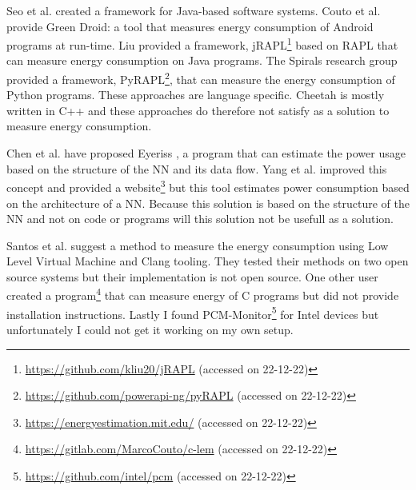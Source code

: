 \documentclass[../thesis.tex]{subfiles}
\begin{document}
Seo et al. \parencite*{seo2008} created a framework for Java-based software systems. Couto et al. \parencite*{couto2015} provide Green Droid: a tool that measures energy consumption of Android programs at run-time. Liu provided a framework, jRAPL\footnote{\url{https://github.com/kliu20/jRAPL} (accessed on 22-12-22)} based on RAPL that can measure energy consumption on Java programs. The Spirals research group provided a framework, PyRAPL\footnote{\url{https://github.com/powerapi-ng/pyRAPL} (accessed on 22-12-22)}, that can measure the energy consumption of Python programs. These approaches are language specific. Cheetah is mostly written in C++ and these approaches do therefore not satisfy as a solution to measure energy consumption.

Chen et al. have proposed Eyeriss \parencite{chen2016, chen20162}, a program that can estimate the power usage based on the structure of the NN and its data flow. Yang et al. \parencite*{yang2016} improved this concept and provided a website\footnote{\url{https://energyestimation.mit.edu/} (accessed on 22-12-22)} but this tool estimates power consumption based on the architecture of a NN. Because this solution is based on the structure of the NN and not on code or programs will this solution not be usefull as a solution.

Santos et al. \parencite*{santos2017} suggest a method to measure the energy consumption using Low Level Virtual Machine and Clang tooling. They tested their methods on two open source systems but their implementation is not open source. One other user created a program\footnote{\url{https://gitlab.com/MarcoCouto/c-lem} (accessed on 22-12-22)} that can measure energy of C programs but did not provide installation instructions. Lastly I found PCM-Monitor\footnote{\url{https://github.com/intel/pcm} (accessed on 22-12-22)} for Intel devices but unfortunately I could not get it working on my own setup. 
\end{document}
